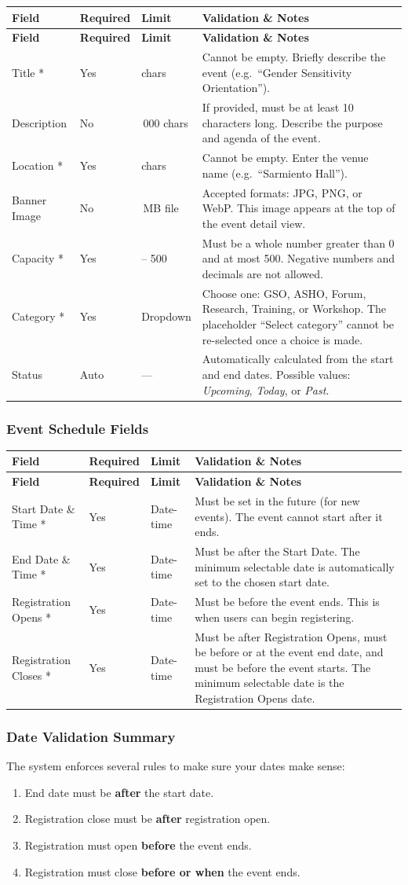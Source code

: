 \documentclass[12pt, a4paper]{article}
\newenvironment{fieldtable}{%
  \begin{longtable}{|>{\raggedright\arraybackslash}p{2.5cm}|>{\raggedright\arraybackslash}p{1.5cm}|>{\raggedright\arraybackslash}p{2.5cm}|>{\raggedright\arraybackslash}p{7.5cm}|}
  \hline
  \rowcolor{lightgray}
  \textbf{Field} & \textbf{Required} & \textbf{Limit} & \textbf{Validation \& Notes} \\
  \hline
  \endfirsthead
  \hline
  \rowcolor{lightgray}
  \textbf{Field} & \textbf{Required} & \textbf{Limit} & \textbf{Validation \& Notes} \\
  \hline
  \endhead
  \hline
  \endfoot
}{%
  \end{longtable}
}
\newcommand{\fieldrow}[4]{%
  #1 & #2 & #3 & #4 \\ \hline
}
\begin{document}
\begin{fieldtable}
  \fieldrow{Title *}{Yes}{500 chars}{Cannot be empty. Briefly describe the event (e.g.\ ``Gender Sensitivity Orientation'').}
  \fieldrow{Description}{No}{5\,000 chars}{If provided, must be at least 10 characters long. Describe the purpose and agenda of the event.}
  \fieldrow{Location *}{Yes}{100 chars}{Cannot be empty. Enter the venue name (e.g.\ ``Sarmiento Hall'').}
  \fieldrow{Banner Image}{No}{5\,MB file}{Accepted formats: JPG, PNG, or WebP. This image appears at the top of the event detail view.}
  \fieldrow{Capacity *}{Yes}{1 -- 500}{Must be a whole number greater than 0 and at most 500. Negative numbers and decimals are not allowed.}
  \fieldrow{Category *}{Yes}{Dropdown}{Choose one: GSO, ASHO, Forum, Research, Training, or Workshop. The placeholder ``Select category'' cannot be re-selected once a choice is made.}
  \fieldrow{Status}{Auto}{---}{Automatically calculated from the start and end dates. Possible values: \textit{Upcoming}, \textit{Today}, or \textit{Past}.}
\end{fieldtable}

\subsubsection{Event Schedule Fields}

\begin{fieldtable}
  \fieldrow{Start Date \& Time *}{Yes}{Date-time}{Must be set in the future (for new events). The event cannot start after it ends.}
  \fieldrow{End Date \& Time *}{Yes}{Date-time}{Must be after the Start Date. The minimum selectable date is automatically set to the chosen start date.}
  \fieldrow{Registration Opens *}{Yes}{Date-time}{Must be before the event ends. This is when users can begin registering.}
  \fieldrow{Registration Closes *}{Yes}{Date-time}{Must be after Registration Opens, must be before or at the event end date, and must be before the event starts. The minimum selectable date is the Registration Opens date.}
\end{fieldtable}

\subsubsection{Date Validation Summary}
The system enforces several rules to make sure your dates make sense:
\begin{enumerate}[leftmargin=1.5em]
  \item End date must be \textbf{after} the start date.
  \item Registration close must be \textbf{after} registration open.
  \item Registration must open \textbf{before} the event ends.
  \item Registration must close \textbf{before or when} the event ends.
\end{enumerate}
\end{document}
